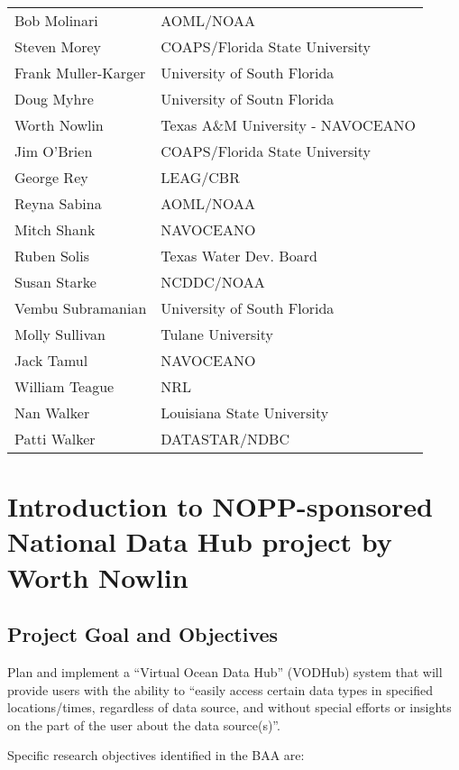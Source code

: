 \begin{center}
\begin{tabular}[t]{ll}
Bob Molinari &       AOML/NOAA \\
Steven Morey &       COAPS/Florida State University \\
Frank Muller-Karger & University of South Florida \\
Doug Myhre &         University of Soutn Florida \\
Worth Nowlin &       Texas A\&M University - NAVOCEANO \\
Jim O'Brien &        COAPS/Florida State University \\
George Rey &         LEAG/CBR \\
Reyna Sabina &       AOML/NOAA \\
Mitch Shank &        NAVOCEANO \\
Ruben Solis &        Texas Water Dev. Board \\
Susan Starke &       NCDDC/NOAA \\
Vembu Subramanian &  University of South Florida \\
Molly Sullivan &     Tulane University \\
Jack Tamul &         NAVOCEANO \\
William Teague &     NRL \\
Nan Walker &         Louisiana State University \\
Patti Walker &       DATASTAR/NDBC \\
\end{tabular}
\end{center}

\section{Introduction to NOPP-sponsored National Data Hub project by Worth 
Nowlin}
\label{I,presentation}

\subsection{Project Goal and Objectives}

Plan and implement a ``Virtual Ocean Data Hub'' (VODHub) system that will provide users with 
the ability to ``easily access certain data types in specified locations/times, regardless of data 
source, and without special efforts or insights on the part of the user about the data source(s)''.

Specific research objectives identified in the BAA are:

